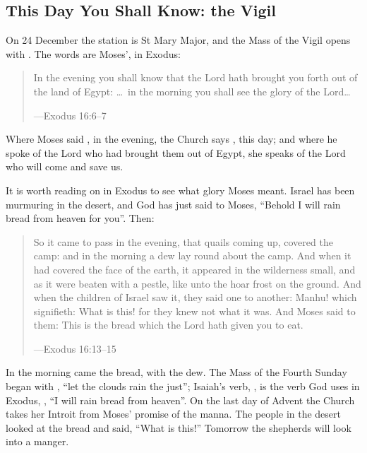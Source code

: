 \subsection{This Day You Shall Know: the Vigil}\label{sec:vigil}

On 24 December the station is St Mary Major, and the Mass of the Vigil opens
with . The words are Moses', in Exodus:

\begin{quote}
In the evening you shall know that the Lord hath brought you forth out of the
land of Egypt: \dots\ in the morning you shall see the glory of the Lord\dots\par
{\smallskip\noindent\small ---Exodus 16:6--7\par}
\end{quote}

Where Moses said , in the evening, the Church says ,
this day; and where he spoke of the Lord who had brought them out of Egypt, she
speaks of the Lord who will come and save us.

It is worth reading on in Exodus to see what glory Moses meant. Israel has been
murmuring in the desert, and God has just said to Moses, ``Behold I will rain
bread from heaven for you''. Then:

\begin{quote}
So it came to pass in the evening, that quails coming up, covered the camp: and
in the morning a dew lay round about the camp. And when it had covered the
face of the earth, it appeared in the wilderness small, and as it were beaten
with a pestle, like unto the hoar frost on the ground. And when the children of
Israel saw it, they said one to another: Manhu! which signifieth: What is this!
for they knew not what it was. And Moses said to them: This is the bread which
the Lord hath given you to eat.\par
{\smallskip\noindent\small ---Exodus 16:13--15\par}
\end{quote}

In the morning came the bread, with the dew. The Mass of the Fourth Sunday
began with , ``let the clouds rain the just''; Isaiah's verb, , is the verb God uses in
Exodus, , ``I will rain bread from heaven''. On
the last day of Advent the Church takes her Introit from Moses' promise of the
manna. The people in the desert looked at the bread and said, ``What is
this!'' Tomorrow the shepherds will look into a manger.

